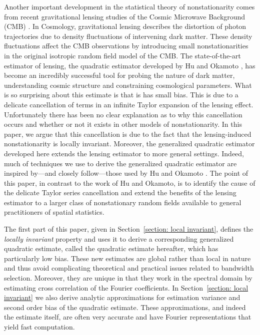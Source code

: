 \documentclass[10pt,noinfoline]{imsart}
\begin{document}
Another important development in the statistical theory of nonstationarity comes from recent gravitational lensing studies of the Cosmic Microwave Background (CMB) \citep{das2011detection,van2012measurement, planck2013lensing, Polarbear2014, planck2015lensing}. In Cosmology, gravitational lensing describes the distortion of photon trajectories due to density fluctuations of intervening dark matter. These density fluctuations affect the CMB observations by introducing small nonstationarities in the original isotropic random field model of the CMB. The state-of-the-art estimator of lensing, the quadratic estimator developed by Hu and Okamoto \cite{hu2001mapping, hu2002mass}, has become an incredibly successful tool for probing the nature of dark matter, understanding cosmic structure and constraining cosmological parameters. What is so surprising about this estimate is that is has small bias. This is due to a delicate cancellation of terms in an infinite Taylor expansion of the lensing effect. Unfortunately there has been no clear explanation as to why this cancellation occurs and whether or not it exists in other models of nonstationarity. In this paper, we argue that this cancellation is due to the fact that the lensing-induced nonstationarity is locally invariant. Moreover, the generalized quadratic estimator developed here extends the lensing estimator to more general settings. Indeed, much of techniques we use to derive the generalized quadratic estimator are inspired by---and closely follow---those used by Hu and Okamoto \cite{hu2001mapping, hu2002mass}.  The point of this paper, in contrast to the work of Hu and Okamoto, is to identify the cause of the delicate Taylor series cancellation and extend the benefits of the lensing estimator to a larger class of nonstationary random fields available to general practitioners of spatial statistics.
 

The first part of this paper, given in Section~\ref{section: local invariant}, defines the {\it locally invariant} property and uses it to derive a corresponding generalized quadratic estimate, called the quadratic estimate hereafter,  which has particularly low bias. These new estimates are global rather than local in nature and thus avoid complicating theoretical and practical issues related to bandwidth selection. Moreover, they are unique in that they work in the spectral domain by estimating cross correlation of the Fourier coefficients.  In Section~\ref{section: local invariant} we also derive analytic approximations for estimation variance and second order bias of the quadratic estimate. These approximations, and indeed the estimate itself, are often very accurate and have Fourier representations that yield fast computation.
\end{document}

